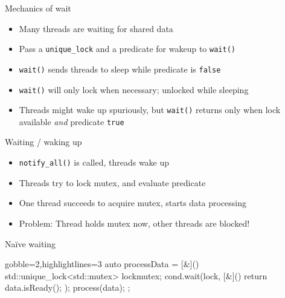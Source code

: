 \begin{frame}[fragile]
  \vspace{-1.2\baselineskip}
  \begin{overprint}
  \begin{block}{Mechanics of wait}
    \begin{itemize}
      \item Many threads are waiting for shared data
      \item Pass a \texttt{unique_lock} and a predicate for wakeup to \texttt{wait()}
      \item \texttt{wait()} sends threads to sleep while predicate is \texttt{false}
      \item \texttt{wait()} will only lock when necessary; unlocked while sleeping
      \item Threads might wake up spuriously, but \texttt{wait()} returns only when lock available \emph{and} predicate \texttt{true}
    \end{itemize}
  \end{block}
  \begin{block}{Waiting / waking up}
    \begin{itemize}
      \item \texttt{notify_all()} is called, threads wake up
      \item Threads try to lock mutex, and evaluate predicate
      \item One thread succeeds to acquire mutex, starts data processing
      \item {\color{red} Problem}: Thread holds mutex now, other threads are blocked!
    \end{itemize}
  \end{block}
  \end{overprint}

  \begin{alertblock}{Na\"ive waiting}
    \begin{cppcode*}{gobble=2,highlightlines=3}
      auto processData = [&](){
        std::unique_lock<std::mutex> lock{mutex};
        cond.wait(lock, [&](){ return data.isReady(); });
        process(data);
      };
    \end{cppcode*}
  \end{alertblock}
\end{frame}


